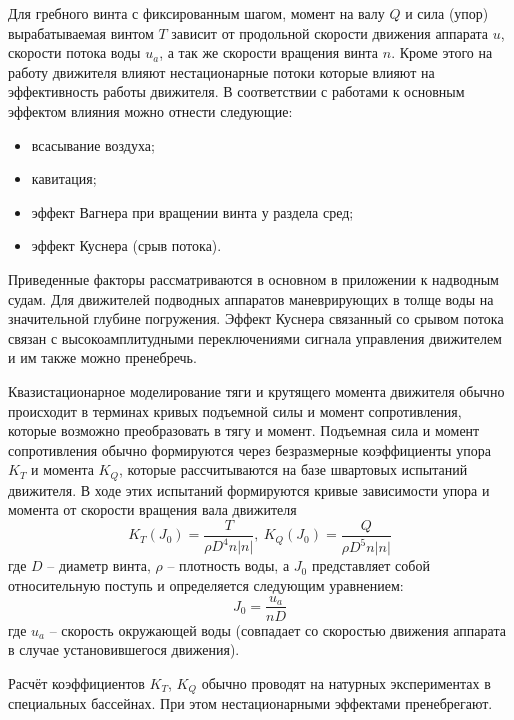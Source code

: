 Для гребного винта с фиксированным шагом, момент на валу $Q$ и сила (упор) вырабатываемая винтом $T$ зависит от продольной скорости движения аппарата $u$, скорости потока воды $u_a$, а так же скорости вращения винта $n$.
Кроме этого на работу движителя влияют нестационарные потоки которые влияют на эффективность работы движителя.
В соответствии с работами \cite{newman2018marine, breslin1996hydrodynamics, carlton2018marine} к основным эффектом влияния можно отнести следующие:
\begin{itemize}
    \item всасывание воздуха;
    \item кавитация;
    \item эффект Вагнера при вращении винта у раздела сред;
    \item эффект Куснера (срыв потока).
\end{itemize}

Приведенные факторы рассматриваются в основном в приложении к надводным судам.
Для движителей подводных аппаратов маневрирующих в толще воды на значительной глубине погружения.
Эффект Куснера связанный со срывом потока связан с высокоамплитудными переключениями сигнала управления движителем и им также можно пренебречь.

Квазистационарное моделирование тяги и крутящего момента движителя обычно происходит в терминах кривых подъемной силы и момент сопротивления, которые возможно преобразовать в тягу и момент.
Подъемная сила и момент сопротивления обычно формируются через безразмерные коэффициенты упора $K_T$ и момента $K_Q$, которые рассчитываются на базе швартовых испытаний движителя.
В ходе этих испытаний формируются кривые зависимости упора и момента от скорости вращения вала движителя
\begin{equation}
    \label{eq:propeler_model}
    K_T (J_0) = \frac{T}{\rho D^4 n |n|}, \:
    K_Q (J_0) = \frac{Q}{\rho D^5 n |n|}    
\end{equation}
\noindent где $D$ -- диаметр винта, $\rho$ -- плотность воды, а $J_0$ представляет собой относительную поступь и определяется следующим уравнением:
\begin{equation*}
    J_0 = \frac{u_a}{nD}
\end{equation*}
\noindent где $u_a$ -- скорость окружающей воды (совпадает со скоростью движения аппарата в случае установившегося движения).

Расчёт коэффициентов $K_T$, $K_Q$ обычно проводят на натурных экспериментах в специальных бассейнах.
При этом нестационарными эффектами пренебрегают.

